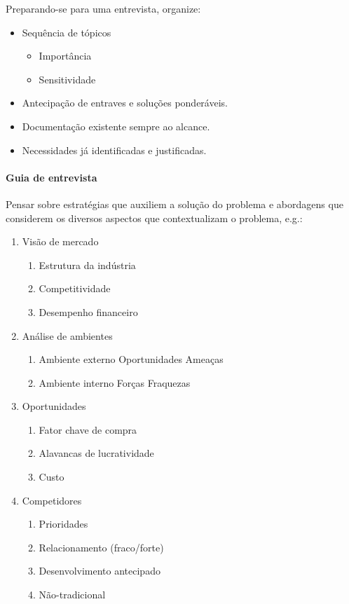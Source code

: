 Preparando-se para uma entrevista, organize:
\begin{itemize}
	\item Sequência de tópicos
	\begin{itemize}
		\item Importância
		\item Sensitividade
	\end{itemize}
	\item Antecipação
	de entraves e soluções ponderáveis.
	\item Documentação
	existente sempre ao alcance.
	\item Necessidades
	já identificadas e justificadas.
\end{itemize}


\paragraph{Guia de entrevista} Pensar sobre estratégias que auxiliem a solução do problema e abordagens que considerem os diversos aspectos que contextualizam o problema, e.g.: 

\begin{enumerate}
	\item Visão de mercado
	\begin{enumerate}
		\item Estrutura da indústria
		\item Competitividade
		\item Desempenho financeiro
	\end{enumerate}
	\item Análise de ambientes
	\begin{enumerate}
		\item Ambiente externo
		\subitem Oportunidades
		\subitem Ameaças
		\item Ambiente interno
		\subitem Forças
		\subitem Fraquezas
	\end{enumerate}
	\item Oportunidades
	\begin{enumerate}
		\item Fator chave de compra
		\item Alavancas de lucratividade
		\item Custo
	\end{enumerate}
	\item Competidores
	\begin{enumerate}
		\item Prioridades
		\item Relacionamento (fraco/forte)
		\item Desenvolvimento antecipado
		\item Não-tradicional
	\end{enumerate}
\end{enumerate}


